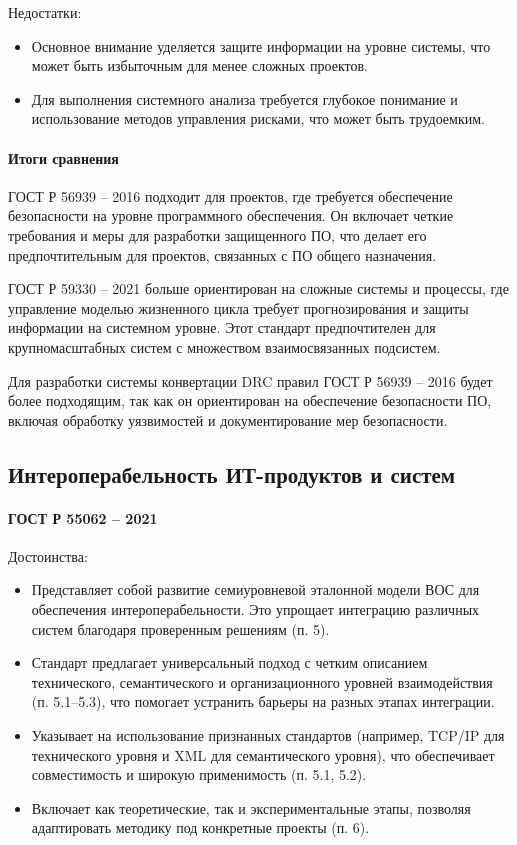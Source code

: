 Недостатки:

\begin{itemize}
	\item Основное внимание уделяется защите информации на уровне системы,
		что может быть избыточным для менее сложных проектов.
	\item Для выполнения системного анализа требуется глубокое понимание
		и использование методов управления рисками, что может быть трудоемким.
\end{itemize}

\paragraph{Итоги сравнения}

ГОСТ Р 56939 -- 2016 подходит для проектов,
где требуется обеспечение безопасности на уровне программного обеспечения.
Он включает четкие требования и меры для разработки защищенного ПО,
что делает его предпочтительным для проектов,
связанных с ПО общего назначения.

ГОСТ Р 59330 -- 2021 больше ориентирован на сложные системы и процессы,
где управление моделью жизненного цикла требует прогнозирования
и защиты информации на системном уровне.
Этот стандарт предпочтителен
для крупномасштабных систем с множеством взаимосвязанных подсистем.

Для разработки системы конвертации DRC правил ГОСТ Р 56939 -- 2016
будет более подходящим, так как он ориентирован на обеспечение безопасности ПО,
включая обработку уязвимостей и документирование мер безопасности.

\subsection{Интероперабельность ИТ-продуктов и систем}

\paragraph{ГОСТ Р 55062 -- 2021}

Достоинства:

\begin{itemize}
	\item Представляет собой развитие семиуровневой эталонной модели ВОС
		для обеспечения интероперабельности.
		Это упрощает интеграцию различных
		систем благодаря проверенным решениям (п. 5).
	\item Стандарт предлагает универсальный подход
		с четким описанием технического, семантического
		и организационного уровней взаимодействия (п. 5.1–5.3),
		что помогает устранить барьеры на разных этапах интеграции.
	\item Указывает на использование признанных стандартов
		(например, TCP/IP для технического уровня
		и XML для семантического уровня),
		что обеспечивает совместимость и широкую применимость (п. 5.1, 5.2).
	\item Включает как теоретические, так и экспериментальные этапы,
		позволяя адаптировать методику под конкретные проекты (п. 6).
\end{itemize}

